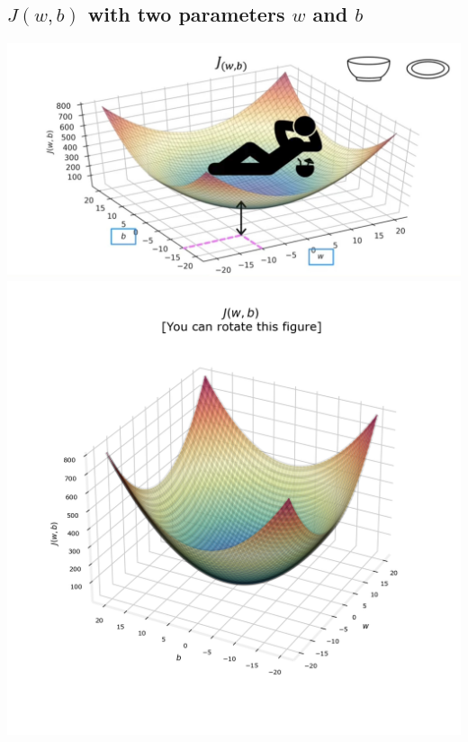 \subsection*{$J(w, b)$ with two parameters $w$ and $b$}
\includegraphics[width=\textwidth]{images/2.2_2}
\vspace{2em}
\includegraphics[width=\textwidth]{images/2.2_6}
